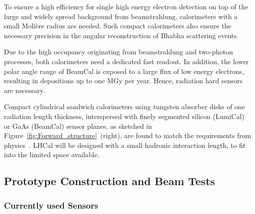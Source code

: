 To ensure a high efficiency for single high energy electron detection on top of the large and widely spread
background from beamstrahlung, calorimeters with a small Moli\`{e}re radius are needed. Such compact calorimeters 
also ensure the necessary  precision in the angular reconstruction of Bhabha scattering events.

Due to the high occupancy originating from beamstrahlung and two-photon processes,
both calorimeters need a dedicated fast readout.
In addition, the lower polar angle range of BeamCal is exposed to a large flux
of low energy electrons, resulting in depositions up to one
MGy per year. Hence, radiation hard sensors are necessary.

Compact
cylindrical sandwich
calorimeters using tungsten absorber disks of one radiation length thickness, interspersed with
finely segmented silicon (LumiCal) or GaAs (BeamCal) sensor planes, as sketched in
Figure~\ref{fig:Forward_structure}~(right),
are found
to match the requirements from physics~\cite{2010JInst...512002A}.
LHCal will be designed with a small hadronic interaction length, to fit into the limited space available.

\subsection{Prototype Construction and Beam Tests}

\subsubsection{Currently used Sensors}

